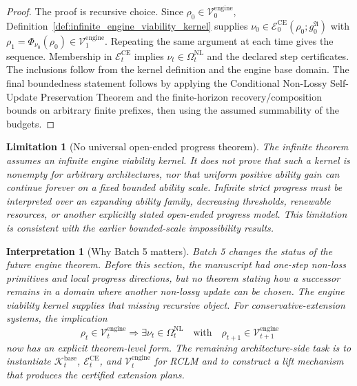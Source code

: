 \documentclass[11pt]{article}
\newtheorem{interpretation}[theorem]{Interpretation}
\newtheorem{limitation}[theorem]{Limitation}
\newcommand{\Ecal}{\mathcal{E}}
\newcommand{\1}{\mathbf{1}}
\providecommand{\Kcal}{\mathcal{K}}
\providecommand{\Vcal}{\mathcal{V}}
\begin{document}
\begin{proof}
The proof is recursive choice.  Since \(\rho_0\in\Vcal_0^{\mathrm{engine}}\), Definition~\ref{def:infinite_engine_viability_kernel} supplies \(\nu_0\in\Ecal_0^{\mathrm{CE}}(\rho_0;g_0^{\mathfrak A})\) with \(\rho_1=\Phi_{\nu_0}(\rho_0)\in\Vcal_1^{\mathrm{engine}}\).  Repeating the same argument at each time gives the sequence.  Membership in \(\Ecal_t^{\mathrm{CE}}\) implies \(\nu_t\in\Omega_t^{\mathrm{NL}}\) and the declared step certificates.  The inclusions follow from the kernel definition and the engine base domain.  The final boundedness statement follows by applying the Conditional Non-Lossy Self-Update Preservation Theorem and the finite-horizon recovery/composition bounds on arbitrary finite prefixes, then using the assumed summability of the budgets.
\end{proof}

\begin{limitation}[No universal open-ended progress theorem]
The infinite theorem assumes an infinite engine viability kernel.  It does not prove that such a kernel is nonempty for arbitrary architectures, nor that uniform positive ability gain can continue forever on a fixed bounded ability scale.  Infinite strict progress must be interpreted over an expanding ability family, decreasing thresholds, renewable resources, or another explicitly stated open-ended progress model.  This limitation is consistent with the earlier bounded-scale impossibility results.
\end{limitation}

\begin{interpretation}[Why Batch 5 matters]
Batch 5 changes the status of the future engine theorem.  Before this section, the manuscript had one-step non-loss primitives and local progress directions, but no theorem stating how a successor remains in a domain where another non-lossy update can be chosen.  The engine viability kernel supplies that missing recursive object.  For conservative-extension systems, the implication
\[
\rho_t\in\Vcal_t^{\mathrm{engine}}
\Longrightarrow
\exists\nu_t\in\Omega_t^{\mathrm{NL}}
\quad\text{with}\quad
\rho_{t+1}\in\Vcal_{t+1}^{\mathrm{engine}}
\]
now has an explicit theorem-level form.  The remaining architecture-side task is to instantiate \(\Kcal_t^{\mathrm{base}}\), \(\Ecal_t^{\mathrm{CE}}\), and \(\Vcal_t^{\mathrm{engine}}\) for RCLM and to construct a lift mechanism that produces the certified extension plans.
\end{interpretation}
\end{document}
